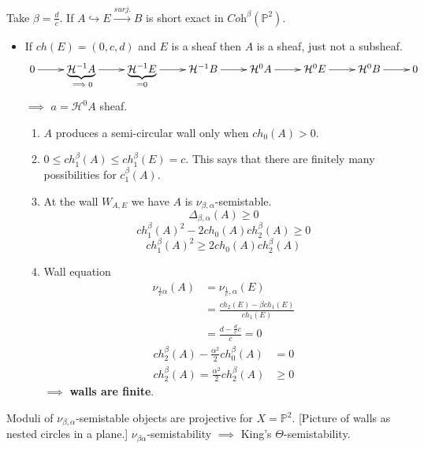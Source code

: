 \medskip\noindent
Take $\beta=\frac{d}{c}$. If $A
\hookrightarrow E  \xrightarrow{surj.} B$ is
short exact in
$\textit{Coh}^\beta(\mathbb{P}^2)$.
\begin{itemize}
\item If $ch(E)=(0,c,d)$ and $E$ is
a sheaf then $A$ is a sheaf, just not a
subsheaf.
$$
\xymatrix{
0\ar[r]&\underbrace{\mathcal{H}^{-1}A}
_{\implies
0}\ar[r]
&  \underbrace{\mathcal{H}^{-1}E}_{=0}\ar[r]
&  \mathcal{H}^{-1}B\ar[r]
&  \mathcal{H}^0A\ar[r]&
\mathcal{H}^0E\ar[r] &
\mathcal{H}^0B\ar[r]&0
}
$$
$\implies$ $a= \mathcal{H}^0A$ sheaf.
\begin{enumerate}
\item $A$ produces a semi-circular wall only
when $ch_0(A)>0$.
\item $0 \leq  ch_1^\beta(A) \leq
ch_1^\beta(E)=c$.
This says that there are finitely many
possibilities for $c_1^\beta(A)$.
\item At the wall $W_{A,E}$ we have $A$ is
$\nu_{\beta,\alpha}$-semistable.
$$
\Delta_{\beta,\alpha}(A)\geq 0
$$
$$
ch_1^\beta(A)^2-2ch_0(A)ch_2^\beta(A)\geq 0
$$
$$
ch_1^\beta(A)^2\geq 2ch_0(A)ch_2^\beta(A)
$$
\item Wall equation
$$
\begin{aligned}
\nu_{\frac{1}{c}\alpha}(A)&=\nu_{\frac{1}{c},
\alpha}(E)\\
&=\frac{ch_2(E)-\beta ch_1(E)}{ch_1(E)}\\
&=\frac{d-\frac{d}{c}c}{c}=0
\end{aligned}
$$
$$
\begin{aligned}
ch_2^\beta(A)-\frac{\alpha^2}{2}ch_0^\beta(A)
&
=0\\
ch_2^\beta(A)=\frac{\alpha^2}{2}ch_2^\beta(A)
&
\geq 0
\end{aligned}
$$
$\implies$ {\bf walls are finite}.
\end{enumerate}
\end{itemize}

\medskip\noindent
Moduli of $\nu_{\beta,\alpha}$-semistable
objects are projective for $X=\mathbb{P}^2$.
[Picture of walls as nested circles in a
plane.] $\nu_{\beta \alpha}$-semistability
$\implies$ King's $\Theta$-semistability.

